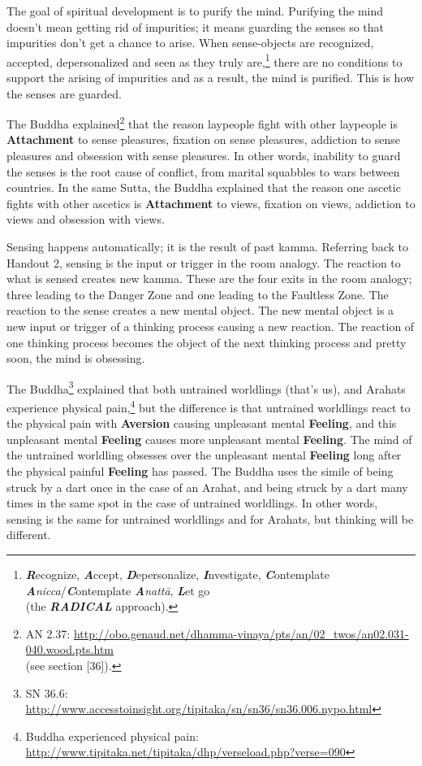 The goal of spiritual development is to purify the mind. Purifying the mind doesn’t mean getting rid of impurities; it means guarding the senses so that impurities don’t get a chance to arise. When sense-objects are recognized, accepted, depersonalized and seen as they truly are,\footnote{\textit{\textbf{R}}ecognize, \textbf{\textit{A}}ccept, \textit{\textbf{D}}epersonalize, \textbf{\textit{I}}nvestigate, \textit{\textbf{C}}ontemplate \textbf{\textit{A}}\textit{nicca}/\textit{\textbf{C}}ontemplate \textbf{\textit{A}}\textit{nattā}, \textbf{\textit{L}}et go \\(the \textit{\textbf{RADICAL}} approach).} there are no conditions to support the arising of impurities and as a result, the mind is purified. This is how the senses are guarded.

The Buddha explained\footnote{AN 2.37: \url{http://obo.genaud.net/dhamma-vinaya/pts/an/02_twos/an02.031-040.wood.pts.htm}\\(see section [36]).} that the reason laypeople fight with other laypeople is \textbf{Attachment} to sense pleasures, fixation on sense pleasures, addiction to sense pleasures and obsession with sense pleasures. In other words, inability to guard the senses is the root cause of conflict, from marital squabbles to wars between countries. In the same Sutta, the Buddha explained that the reason one ascetic fights with other ascetics is \textbf{Attachment} to views, fixation on views, addiction to views and obsession with views.

Sensing happens automatically; it is the result of past kamma. Referring back to Handout 2, sensing is the input or trigger in the room analogy. The reaction to what is sensed creates new kamma. These are the four exits in the room analogy; three leading to the Danger Zone and one leading to the Faultless Zone. The reaction to the sense  creates a new mental object. The new mental object is a new input or trigger of a thinking process causing a new reaction. The reaction of one thinking process becomes the object of the next thinking process and pretty soon, the mind is obsessing.

The Buddha\footnote{SN 36.6: \url{http://www.accesstoinsight.org/tipitaka/sn/sn36/sn36.006.nypo.html}} explained that both untrained worldlings (that’s us), and Arahats experience physical pain,\footnote{Buddha experienced physical pain: \url{http://www.tipitaka.net/tipitaka/dhp/verseload.php?verse=090}} but the difference is that untrained worldlings react to the physical pain with \textbf{Aversion} causing unpleasant mental \textbf{Feeling}, and this unpleasant mental \textbf{Feeling} causes more unpleasant mental \textbf{Feeling}. The mind of the untrained worldling obsesses over the unpleasant mental \textbf{Feeling} long after the physical painful \textbf{Feeling} has passed. The Buddha uses the simile of being struck by a dart once in the case of an Arahat, and being struck by a dart many times in the same spot in the case of untrained worldlings. In other words, sensing is the same for untrained worldlings and for Arahats, but thinking will be different.

